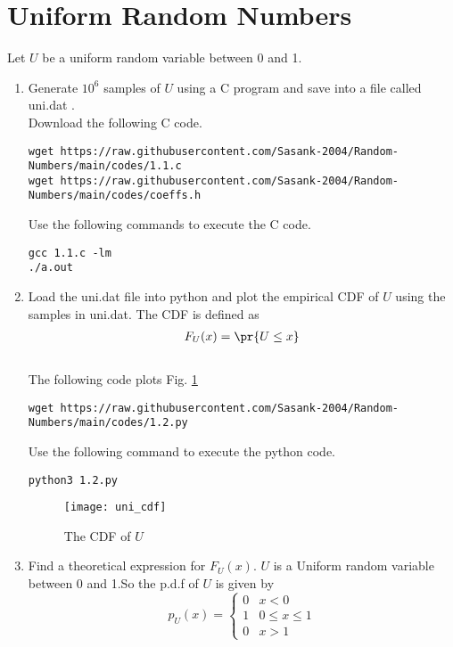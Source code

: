 \documentclass[journal,12pt,twocolumn]{IEEEtran}
\renewcommand\thesection{\arabic{section}}
\begin{document}
\section{Uniform Random Numbers}
Let $U$ be a uniform random variable between 0 and 1.
\begin{enumerate}[label=\thesection.\arabic*
,ref=\thesection.\theenumi]
\item Generate $10^6$ samples of $U$ using a C program and save into a file called uni.dat .
\\
\solution Download the following  C code.
\begin{lstlisting}
wget https://raw.githubusercontent.com/Sasank-2004/Random-Numbers/main/codes/1.1.c
wget https://raw.githubusercontent.com/Sasank-2004/Random-Numbers/main/codes/coeffs.h
\end{lstlisting}
Use the following commands to execute the C code.
\begin{lstlisting}
gcc 1.1.c -lm
./a.out 
\end{lstlisting}
%
\item
Load the uni.dat file into python and plot the empirical CDF of $U$ using the samples in uni.dat. The CDF is defined as
\begin{align}
F_{U}(x) = \pr{U \le x}
\end{align}
\\
\solution  The following code plots Fig. \ref{fig:uni_cdf}
\begin{lstlisting}
wget https://raw.githubusercontent.com/Sasank-2004/Random-Numbers/main/codes/1.2.py
\end{lstlisting}
Use the following command to execute the python code.
\begin{lstlisting}
python3 1.2.py
\end{lstlisting}
\begin{figure}[h]
\centering
\texttt{[image: uni\_cdf]}
\caption{The CDF of $U$}
\label{fig:uni_cdf}
\end{figure}
%
\item 
Find a theoretical expression for $F_{U}(x)$.
\solution $U$ is a Uniform random variable between 0 and 1.So the p.d.f of $U$ is given by \\
\begin{equation}
    p_U(x) = 
    \begin{cases}
    0 & x < 0 \\
    1 & 0 \le x \le 1 \\
    0 & x > 1 
    \end{cases}

\end{equation}
\end{enumerate}
\end{document}
